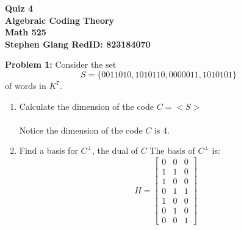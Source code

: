 \documentclass[11pt]{article}
\newcommand{\skipline}{\vspace{\baselineskip}}
\newenvironment{problem}[1]{\textbf{Problem #1: }}{\newpage}
\begin{document}
	
	\begin{center}
		\textbf{Quiz 4} \\
		\textbf{Algebraic Coding Theory} \\
		\textbf{Math 525} \\
		\textbf{Stephen Giang RedID: 823184070} \\
		\skipline \skipline
	\end{center}

	\begin{problem}{1}
		Consider the set
		\[ S = \{0011010,1010110,0000011,1010101\}\]
		of words in $K^7$.
		\begin{enumerate}[label = (\alph*)]
			\item Calculate the dimension of the code $C= <S>$
			\\ \\
			Notice the dimension of the code $C$ is 4.
			\item Find a basis for $C^{\perp}$, the dual of $C$
			The basis of $C^{\perp}$ is:
			\[H = \begin{bmatrix}
				0 & 0 & 0 \\
				1 & 1 & 0 \\
				1 & 0 & 0 \\
				0 & 1 & 1 \\
				1 & 0 & 0 \\
				0 & 1 & 0 \\
				0 & 0 & 1 
			\end{bmatrix}\]
		\end{enumerate}
	\end{problem}
\end{document}
